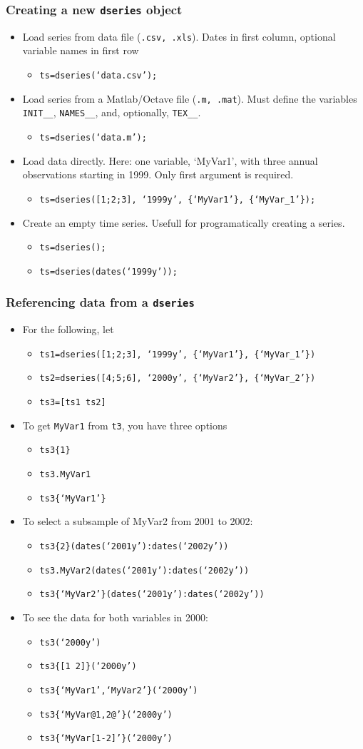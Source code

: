 \documentclass[10pt]{beamer}
\newcommand{\myitem}{\item[$\bullet$]}
\begin{document}
\begin{frame}[fragile,t]
  \frametitle{Creating a new \texttt{dseries} object}
  \begin{itemize}
  \myitem Load series from data file (\texttt{.csv, .xls}). Dates in first column, optional variable names in first row
    \begin{itemize}
    \myitem \texttt{ts=dseries(`data.csv');}
    \end{itemize}
  \myitem Load series from a Matlab/Octave file (\texttt{.m, .mat}). Must define the variables \texttt{INIT\_\_}, \texttt{NAMES\_\_}, and, optionally, \texttt{TEX\_\_}.
    \begin{itemize}
    \myitem \texttt{ts=dseries(`data.m');}
    \end{itemize}
  \myitem Load data directly. Here: one variable, `MyVar1', with three annual observations starting in 1999. Only first argument is required.
    \begin{itemize}
    \myitem \texttt{ts=dseries([1;2;3], `1999y', \{`MyVar1'\}, \{`MyVar\_1'\});}
    \end{itemize}
  \myitem Create an empty time series. Usefull for programatically creating a series.
    \begin{itemize}
    \myitem \texttt{ts=dseries();}
    \myitem \texttt{ts=dseries(dates(`1999y'));}
    \end{itemize}
  \end{itemize}
\end{frame}


\begin{frame}[fragile,t]
  \frametitle{Referencing data from a \texttt{dseries}}
  \begin{itemize}
  \myitem For the following, let
    \begin{itemize}
    \myitem \texttt{ts1=dseries([1;2;3], `1999y', \{`MyVar1'\}, \{`MyVar\_1'\})}
    \myitem \texttt{ts2=dseries([4;5;6], `2000y', \{`MyVar2'\}, \{`MyVar\_2'\})}
    \myitem \texttt{ts3=[ts1 ts2]}
    \end{itemize}
  \myitem To get \texttt{MyVar1} from \texttt{t3}, you have three options
    \begin{itemize}
      \myitem \texttt{ts3\{1\}}
      \myitem \texttt{ts3.MyVar1}
      \myitem \texttt{ts3\{`MyVar1'\}}
    \end{itemize}
  \myitem To select a subsample of MyVar2 from 2001 to 2002:
    \begin{itemize}
      \myitem \texttt{ts3\{2\}(dates(`2001y'):dates(`2002y'))}
      \myitem \texttt{ts3.MyVar2(dates(`2001y'):dates(`2002y'))}
      \myitem \texttt{ts3\{`MyVar2'\}(dates(`2001y'):dates(`2002y'))}
    \end{itemize}
  \myitem To see the data for both variables in 2000:
    \begin{itemize}
      \myitem \texttt{ts3(`2000y')}
      \myitem \texttt{ts3\{[1 2]\}(`2000y')}
      \myitem \texttt{ts3\{`MyVar1',`MyVar2'\}(`2000y')}
      \myitem \texttt{ts3\{`MyVar@1,2@'\}(`2000y')}
      \myitem \texttt{ts3\{`MyVar[1-2]'\}(`2000y')}
    \end{itemize}
  \end{itemize}
\end{frame}
\end{document}
